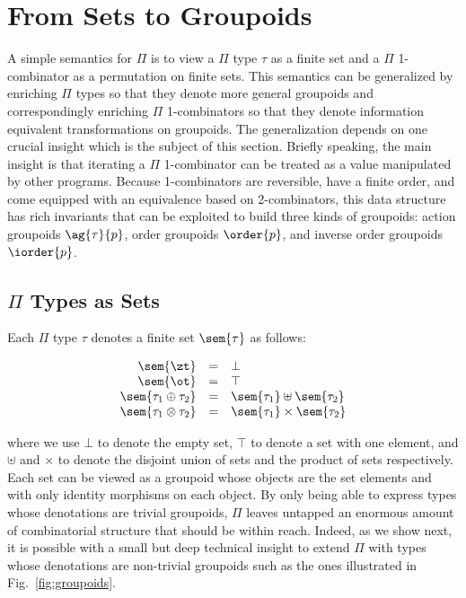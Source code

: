 \section{From Sets to Groupoids} 
\label{sec:groupoids}

A simple semantics for $\Pi$ is to view a $\Pi$ type $\tau$ as a
finite set and a $\Pi$ 1-combinator as a permutation on finite
sets. This semantics can be generalized by enriching $\Pi$ types so
that they denote more general groupoids and correspondingly enriching
$\Pi$ 1-combinators so that they denote information equivalent
transformations on groupoids. The generalization depends on one
crucial insight which is the subject of this section. Briefly
speaking, the main insight is that iterating a $\Pi$ 1-combinator can
be treated as a value manipulated by other programs. Because
1-combinators are reversible, have a finite order, and come equipped
with an equivalence based on 2-combinators, this data structure has
rich invariants that can be exploited to build three kinds of
groupoids: action groupoids $\ag{\tau}{p}$, order groupoids
$\order{p}$, and inverse order groupoids $\iorder{p}$. 
 
\subsection{$\Pi$ Types as Sets}

Each $\Pi$ type $\tau$ denotes a finite set $\sem{\tau}$ as follows:

\[\begin{array}{rcl}
\sem{\zt} &=& \bot \\
\sem{\ot} &=& \top \\
\sem{\tau_1 \oplus \tau_2} &=& \sem{\tau_1} \uplus \sem{\tau_2} \\
\sem{\tau_1 \otimes \tau_2} &=& \sem{\tau_1} \times \sem{\tau_2}
\end{array}\]

\noindent where we use $\bot$ to denote the empty set, $\top$ to
denote a set with one element, and $\uplus$ and $\times$ to denote the
disjoint union of sets and the product of sets respectively. Each set
can be viewed as a groupoid whose objects are the set elements and
with only identity morphisms on each object. By only being able to
express types whose denotations are trivial groupoids, $\Pi$ leaves
untapped an enormous amount of combinatorial structure that should be
within reach. Indeed, as we show next, it is possible with a small but
deep technical insight to extend $\Pi$ with types whose denotations
are non-trivial groupoids such as the ones illustrated in
Fig.~\ref{fig:groupoids}.

